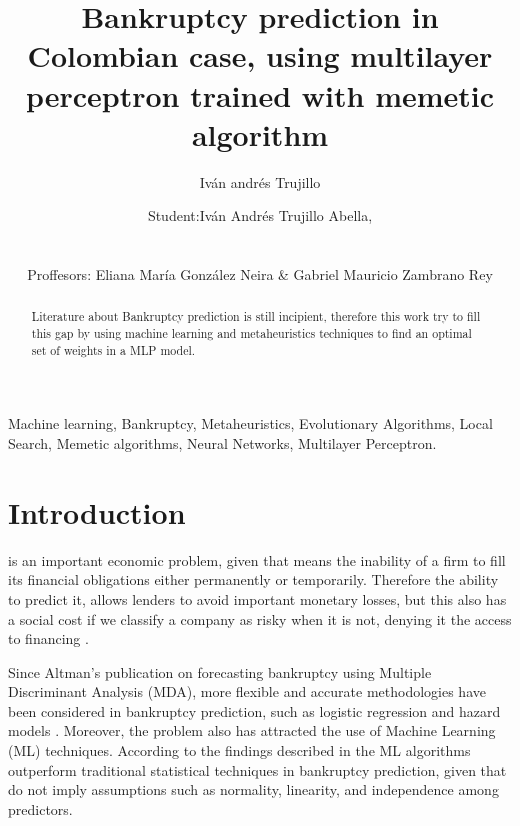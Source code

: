 \documentclass[journal]{IEEEtai}
\begin{document}
\title{Bankruptcy prediction in Colombian case, using multilayer perceptron trained with memetic algorithm} 


\author{ Iván andrés Trujillo }

\author{Student:Iván Andrés Trujillo Abella,\\

\\
\\

Proffesors: Eliana María González Neira \& Gabriel Mauricio Zambrano Rey}
\maketitle

\begin{abstract}
Literature about Bankruptcy prediction is still incipient, therefore this work try to fill this gap by using machine learning  and metaheuristics techniques to find an optimal set of  weights in a MLP model.
\end{abstract}


\begin{IEEEkeywords}
Machine learning, Bankruptcy, Metaheuristics, Evolutionary Algorithms, Local Search, Memetic algorithms, Neural Networks, Multilayer Perceptron.
\end{IEEEkeywords}



\section{Introduction}
 is an important economic problem, given that means the inability of a firm to fill its financial obligations either permanently or temporarily. Therefore the ability to predict it, allows  lenders to avoid important monetary losses, but this also has a social cost if we classify a company as risky when it is not, denying it the access to financing \cite{C1}.



Since Altman's publication \cite{I2} on forecasting bankruptcy using Multiple Discriminant Analysis (MDA), more flexible and accurate methodologies have been considered in bankruptcy prediction, such as logistic regression \cite{I3} and hazard models \cite{I4}. Moreover, the problem also has attracted the use of Machine Learning (ML) techniques.  According to the findings described in  \cite{I5,I6,I7,I8} the ML algorithms outperform traditional statistical techniques in bankruptcy prediction, given that do not imply assumptions such as normality, linearity, and independence among predictors.
\end{document}
